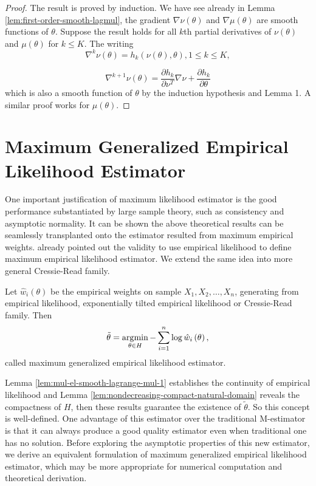 \begin{proof}
The result is proved by induction. We have see already in Lemma \ref{lem:first-order-smooth-lagmul},
the gradient $\nabla\nu\left(\theta\right)$ and $\nabla\mu\left(\theta\right)$
are smooth functions of $\theta$. Suppose the result holds for all
$k$th partial derivatives of $\nu\left(\theta\right)$ and $\mu\left(\theta\right)$
for $k\le K$. The writing 
\[
\nabla^{k}\nu\left(\theta\right)=h_{k}\left(\nu\left(\theta\right),\theta\right),1\le k\le K,
\]
 
\[
\nabla^{k+1}\nu\left(\theta\right)=\frac{\partial h_{k}}{\partial\nu^{T}}\nabla\nu+\frac{\partial h_{k}}{\partial\theta}
\]
which is also a smooth function of $\theta$ by the induction hypothesis
and Lemma 1. A similar proof works for $\mu\left(\theta\right)$.
\end{proof}

\section{Maximum Generalized Empirical Likelihood Estimator}

One important justification of maximum likelihood estimator is the
good performance substantiated by large sample theory, such as consistency
and asymptotic normality. It can be shown the above theoretical results
can be seamlessly transplanted onto the estimator resulted from maximum
empirical weights. \citet{qin1994empirical} already pointed out the
validity to use empirical likelihood to define maximum empirical likelihood
estimator. We extend the same idea into more general Cressie-Read
family. 
\begin{defn}
\label{def:gmele}Let $\hat{w}_{i}\left(\theta\right)$ be the empirical
weights on sample $X_{1},X_{2},\ldots,X_{n}$, generating from empirical
likelihood, exponentially tilted empirical likelihood or Cressie-Read
family. Then 
\[
\tilde{\theta}=\operatorname*{\arg\!\min}_{\theta\in H}-\sum_{i=1}^{n}\log\hat{w}_{i}\left(\theta\right),
\]
called  maximum generalized empirical likelihood estimator.
\end{defn}
Lemma \ref{lem:mul-el-smooth-lagrange-mul-1} establishes the continuity
of empirical likelihood and Lemma \ref{lem:nondecreasing-compact-natural-domain}
reveals the compactness of $H$, then these results guarantee the
existence of $\tilde{\theta}$. So this concept is well-defined. One
advantage of this estimator over the traditional M-estimator is that
it can always produce a good quality estimator even when traditional
one has no solution. Before exploring the asymptotic properties of
this new estimator, we derive an equivalent formulation of  maximum
generalized empirical likelihood estimator, which may be more appropriate
for numerical computation and theoretical derivation. 

